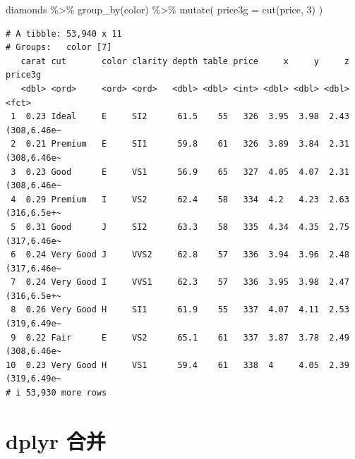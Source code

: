 \documentclass[
  letterpaper,
]{ctexbook}
\newenvironment{Shaded}{\begin{snugshade}}{\end{snugshade}}
\newcommand{\AttributeTok}[1]{\textcolor[rgb]{0.40,0.45,0.13}{#1}}
\newcommand{\DecValTok}[1]{\textcolor[rgb]{0.68,0.00,0.00}{#1}}
\newcommand{\FunctionTok}[1]{\textcolor[rgb]{0.28,0.35,0.67}{#1}}
\newcommand{\NormalTok}[1]{\textcolor[rgb]{0.00,0.23,0.31}{#1}}
\newcommand{\SpecialCharTok}[1]{\textcolor[rgb]{0.37,0.37,0.37}{#1}}
\begin{document}
\begin{Shaded}
\begin{Highlighting}[]
\NormalTok{diamonds }\SpecialCharTok{\%\textgreater{}\%}
  \FunctionTok{group\_by}\NormalTok{(color) }\SpecialCharTok{\%\textgreater{}\%}
  \FunctionTok{mutate}\NormalTok{(}
    \AttributeTok{price3g =} \FunctionTok{cut}\NormalTok{(price, }\DecValTok{3}\NormalTok{)}
\NormalTok{  )}
\end{Highlighting}
\end{Shaded}

\begin{verbatim}
# A tibble: 53,940 x 11
# Groups:   color [7]
   carat cut       color clarity depth table price     x     y     z price3g    
   <dbl> <ord>     <ord> <ord>   <dbl> <dbl> <int> <dbl> <dbl> <dbl> <fct>      
 1  0.23 Ideal     E     SI2      61.5    55   326  3.95  3.98  2.43 (308,6.46e~
 2  0.21 Premium   E     SI1      59.8    61   326  3.89  3.84  2.31 (308,6.46e~
 3  0.23 Good      E     VS1      56.9    65   327  4.05  4.07  2.31 (308,6.46e~
 4  0.29 Premium   I     VS2      62.4    58   334  4.2   4.23  2.63 (316,6.5e+~
 5  0.31 Good      J     SI2      63.3    58   335  4.34  4.35  2.75 (317,6.46e~
 6  0.24 Very Good J     VVS2     62.8    57   336  3.94  3.96  2.48 (317,6.46e~
 7  0.24 Very Good I     VVS1     62.3    57   336  3.95  3.98  2.47 (316,6.5e+~
 8  0.26 Very Good H     SI1      61.9    55   337  4.07  4.11  2.53 (319,6.49e~
 9  0.22 Fair      E     VS2      65.1    61   337  3.87  3.78  2.49 (308,6.46e~
10  0.23 Very Good H     VS1      59.4    61   338  4     4.05  2.39 (319,6.49e~
# i 53,930 more rows
\end{verbatim}

\hypertarget{dplyr-ux5408ux5e76}{%
\chapter{dplyr 合并}\label{dplyr-ux5408ux5e76}}
\end{document}
